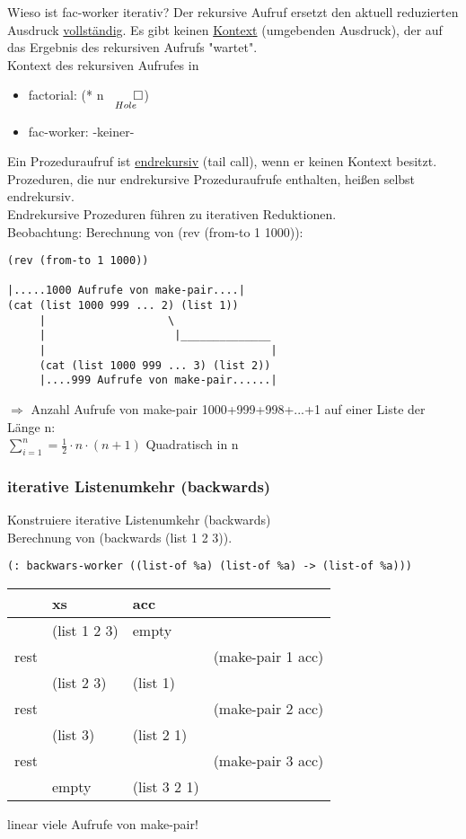 \documentclass[a4paper,12pt]{article}
\begin{document}
Wieso ist fac-worker iterativ? Der rekursive Aufruf ersetzt den aktuell reduzierten Ausdruck \uline{vollständig}. Es gibt keinen \uline{Kontext} (umgebenden Ausdruck), der auf das Ergebnis des rekursiven Aufrufs "wartet".\\
Kontext des rekursiven Aufrufes in
\begin{itemize}
\item factorial: (* n $\underset{Hole}{\qed}$)
\item fac-worker: -keiner-
\end{itemize}
Ein Prozeduraufruf ist \uline{endrekursiv} (tail call), wenn er keinen Kontext besitzt.\\
Prozeduren, die nur endrekursive Prozeduraufrufe enthalten, heißen selbst endrekursiv.\\
Endrekursive Prozeduren führen zu iterativen Reduktionen. \\
Beobachtung: Berechnung von (rev (from-to 1 1000)):

\begin{lstlisting}[style=customc]
(rev (from-to 1 1000))

|.....1000 Aufrufe von make-pair....|
(cat (list 1000 999 ... 2) (list 1))
     |                   \
     |                    |______________
     |                                   |
     (cat (list 1000 999 ... 3) (list 2))
     |....999 Aufrufe von make-pair......|
\end{lstlisting}
$\Rightarrow$ Anzahl Aufrufe von make-pair 1000+999+998+...+1 auf einer Liste der Länge n:\\

$\sum_{i=1}^{n} = \frac{1}{2} \cdot n \cdot (n+1)$ \hfil Quadratisch in n\\

\subsubsection{iterative Listenumkehr (backwards)}
Konstruiere iterative Listenumkehr (backwards)\\
Berechnung von (backwards (list 1 2 3)).
\begin{lstlisting}[style=customc]
(: backwars-worker ((list-of %a) (list-of %a) -> (list-of %a)))
\end{lstlisting}
\begin{center}


\begin{tabular}{rl|ll}
&xs & acc& \\
\hline
&(list 1 2 3) & empty& \\
rest &&& (make-pair 1 acc) \\
&(list 2 3) & (list 1)& \\
rest &&& (make-pair 2 acc) \\
&(list 3) & (list 2 1)& \\
rest &&& (make-pair 3 acc) \\
& empty & (list 3 2 1) & \\
\end{tabular}
\end{center}
linear viele Aufrufe von make-pair!\\
\end{document}
